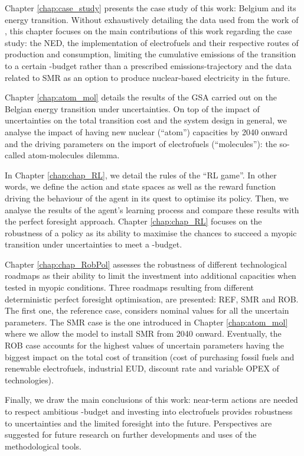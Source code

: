 Chapter \ref{chap:case_study} presents the case study of this work: Belgium and its energy transition. Without exhaustively detailing the data used from the work of \citet{limpens2021generating}, this chapter focuses on the main contributions of this work regarding the case study: the \gls{NED}, the implementation of electrofuels and their respective routes of production and consumption, limiting  the cumulative emissions of the transition to a certain -budget rather than a prescribed emissions-trajectory and the data related to \gls{SMR} as an option to produce nuclear-based electricity in the future.

Chapter \ref{chap:atom_mol} details the results of the \gls{GSA} carried out on the Belgian energy transition under uncertainties. On top of the impact of uncertainties on the total transition cost and the system design in general, we analyse the impact of having new nuclear (``atom'') capacities by 2040 onward and the driving parameters on the import of electrofuels (``molecules''): the so-called atom-molecules dilemma.

In Chapter \ref{chap:chap_RL}, we detail the rules of the ``\gls{RL} game''. In other words, we define the action and state spaces as well as the reward function driving the behaviour of the agent in its quest to optimise its policy. Then, we analyse the results of the agent's learning process and compare these results with the perfect foresight approach.  Chapter \ref{chap:chap_RL} focuses on the robustness of a policy as its ability to maximise the chances to succeed a myopic transition under uncertainties to meet a -budget.

Chapter \ref{chap:chap_RobPol} assesses the robustness of different technological roadmaps as their ability to limit the investment into additional capacities when tested in myopic conditions. Three roadmaps resulting from different deterministic perfect foresight optimisation, are presented: REF, SMR and ROB. The first one, the reference case, considers nominal values for all the uncertain parameters. The SMR case is the one introduced in Chapter \ref{chap:atom_mol} where we allow the model to install \gls{SMR} from 2040 onward. Eventually, the ROB case accounts for the highest values of uncertain parameters having the biggest impact on the total cost of transition (\ie cost of purchasing fossil fuels and renewable electrofuels, industrial \gls{EUD}, discount rate and variable \gls{OPEX} of technologies).

Finally, we draw the main conclusions of this work: near-term actions are needed to respect ambitious -budget and investing into electrofuels provides robustness to uncertainties and the limited foresight into the future.  Perspectives are suggested for future research on further developments and uses of the methodological tools.


